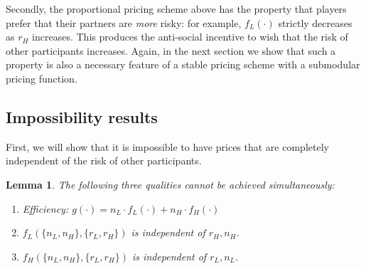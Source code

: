 \documentclass[sigconf]{acmart}
\newtheorem{lemma}{Lemma}
\newcommand{\nL}[0]{\ensuremath{n_L}}
\newcommand{\nH}[0]{\ensuremath{n_H}}
\newcommand{\rL}[0]{\ensuremath{r_L}}
\newcommand{\rH}[0]{\ensuremath{r_H}}
\newcommand{\cost}[0]{\ensuremath{g}}
\newcommand{\priceL}[0]{\ensuremath{f_L}}
\newcommand{\priceH}[0]{\ensuremath{f_H}}
\newcommand{\cd}[0]{\cdot}
\begin{document}
Secondly, the proportional pricing scheme above has the property that players prefer that their partners are \emph{more} risky: for example, $\priceL(\cd)$ strictly decreases as $\rH$ increases. This produces the anti-social incentive to wish that the risk of other participants increases. Again, in the next section we show that such a property is also a necessary feature of a stable pricing scheme with a submodular pricing function.  
\subsection{Impossibility results}
First, we will show that it is impossible to have prices that are completely independent of the risk of other participants. 

\begin{lemma}\label{threequal}
The following three qualities cannot be achieved simultaneously: 
\begin{enumerate}
    \item Efficiency: $\cost(\cd )=\nL \cd\priceL(\cd ) + \nH \cd \priceH(\cd )$
    \item $\priceL(\{\nL, \nH\}, \{\rL, \rH\})$ is independent of $\rH, \nH$. 
    \item $\priceH(\{\nL, \nH\}, \{\rL, \rH\})$ is independent of $\rL, \nL$.
\end{enumerate}
\end{lemma}
\end{document}
